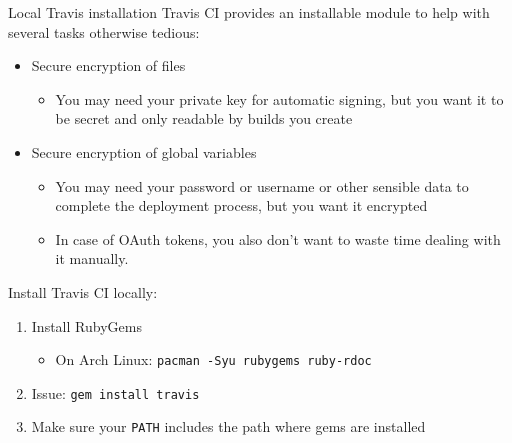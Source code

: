 \documentclass[presentation]{beamer}
\begin{document}
\begin{frame}{Local Travis installation}
    Travis CI provides an installable module to help with several tasks otherwise tedious:
    \begin{itemize}
        \item Secure encryption of files
        \begin{itemize}
            \item You may need your private key for automatic signing, but you want it to be secret and only readable by builds you create
        \end{itemize}
        \item Secure encryption of global variables
        \begin{itemize}
            \item You may need your password or username or other sensible data to complete the deployment process, but you want it encrypted
            \item In case of OAuth tokens, you also don't want to waste time dealing with it manually.
        \end{itemize}
    \end{itemize}
    Install Travis CI locally:
    \begin{enumerate}
        \item Install RubyGems
        \begin{itemize}
            \item On Arch Linux: \texttt{pacman -Syu rubygems ruby-rdoc}
        \end{itemize}
        \item Issue: \texttt{gem install travis}
        \item Make sure your \texttt{PATH} includes the path where gems are installed
    \end{enumerate}
\end{frame}
\end{document}
